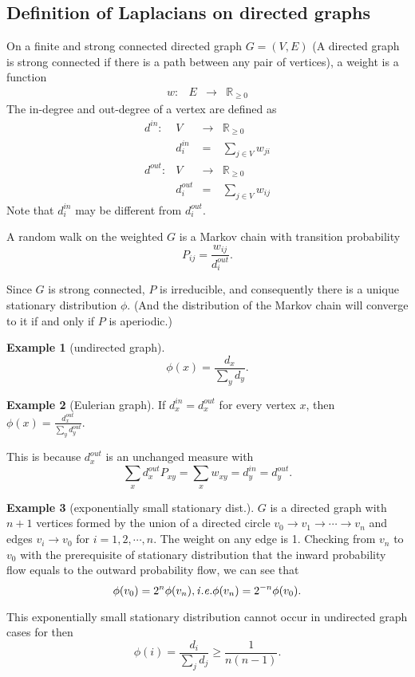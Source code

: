 \documentclass[twoside]{article}
\theoremstyle{definition}
\newenvironment{map}{\[\begin{array}{cccc}} {\end{array}\]}
\theoremstyle{definition}
\newtheorem*{exmp}{Example}
\theoremstyle{remark}
\def\R{{\mathbb R}}
\def\ie{{\it i.e. }}
\begin{document}
\subsection{Definition of Laplacians on directed graphs}
  On a finite and strong connected directed graph $G=(V,E)$ (A directed graph is strong connected if there is a path between any pair of vertices), a weight is a function
  \begin{map}
  w: & E & \rightarrow & \R_{\geq0}
  \end{map}
  The in-degree and out-degree of a vertex are defined as
  \begin{map}
  d^{in}: & V & \rightarrow & \R_{\geq0} \\
          & d^{in}_i & = & \sum_{j\in V} w_{ji} \\
  d^{out}: & V & \rightarrow & \R_{\geq0} \\
          & d^{out}_i & = & \sum_{j\in V} w_{ij}
  \end{map}
  Note that $d^{in}_{i}$ may be different from $d^{out}_{i}$.

  A random walk on the weighted $G$ is a Markov chain with transition probability
  \[P_{ij}=\frac{w_{ij}}{d^{out}_{i}}.\]

  Since $G$ is strong connected, $P$ is irreducible, and consequently there is a unique stationary distribution $\phi$. (And the distribution of the Markov chain will converge to it if and only if $P$ is aperiodic.)

  \begin{exmp}[undirected graph]
  \[\phi(x)=\frac{d_x}{\sum_{y}d_y}.\]
  \end{exmp}

  \begin{exmp}[Eulerian graph]
  If $d^{in}_{x}=d^{out}_{x}$ for every vertex $x$, then $\phi(x)=\frac{d^{out}_x}{\sum_{y}d^{out}_y}.$

  This is because $d^{out}_x$ is an unchanged measure with
  \[\sum_x d^{out}_xP_{xy}=\sum_x w_{xy}=d^{in}_y=d^{out}_y.\]
  \end{exmp}

  \begin{exmp}[exponentially small stationary dist.]
  $G$ is a directed graph with $n+1$ vertices formed by the union of a directed circle $v_0\rightarrow v_1 \rightarrow \cdots \rightarrow v_n$ and edges $v_i\rightarrow v_0$ for $i=1,2,\cdots,n$. The weight on any edge is 1. Checking from $v_n$ to $v_0$ with the prerequisite of stationary distribution that the inward probability flow equals to the outward probability flow, we can see that
  \[\phi(v_0)= 2^n \phi(v_n), \ie \phi(v_n) =2^{-n} \phi(v_0).\]

  This exponentially small stationary distribution cannot occur in undirected graph cases for then
  \[\phi(i)=\frac{d_i}{\sum_{j}d_j} \geq \frac{1}{n(n-1)}.\]
  \end{exmp}
\end{document}
